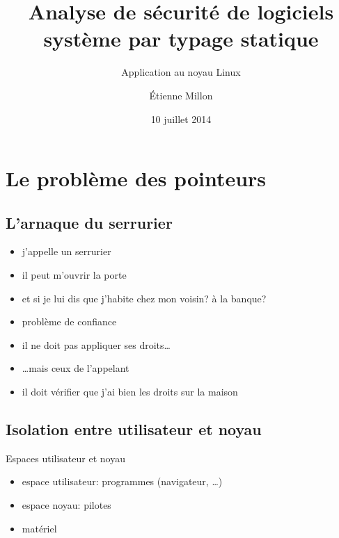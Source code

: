 \documentclass{beamer}
\title{Analyse de sécurité de logiciels système par typage statique}
\subtitle{Application au noyau Linux}
\author{Étienne Millon}
\date{10 juillet 2014}
\begin{document}

\frame{\titlepage}

\frame{\tableofcontents}

\section{Le problème des pointeurs}

\subsection{L'arnaque du serrurier}

\begin{frame}

\begin{itemize}
\item
  j'appelle un serrurier
\item
  il peut m'ouvrir la porte
\item
  et si je lui dis que j'habite chez mon voisin? à la banque?
\end{itemize}

\end{frame}
\begin{frame}

\begin{itemize}
\item problème de confiance
\item il ne doit pas appliquer ses droits…
\item …mais ceux de l'appelant
\item il doit vérifier que j'ai bien les droits sur la maison
\end{itemize}

\end{frame}

\subsection{Isolation entre utilisateur et noyau}

\begin{frame}{Espaces utilisateur et noyau}
    \begin{itemize}
        \item espace utilisateur: programmes (navigateur, …)
        \item espace noyau: pilotes
        \item matériel
    \end{itemize}
\end{frame}
\end{document}
